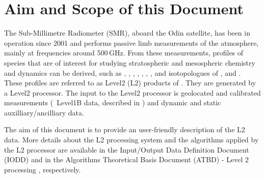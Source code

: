 \chapter{Aim and Scope of this Document}
\label{chapter:intro}

\setcounter{page}{1}

The Sub-Millimetre Radiometer (SMR), aboard the Odin satellite, has been in operation
since 2001 and performs passive limb measurements of the atmosphere, mainly at 
frequencies around 500\,GHz. From these measurements, profiles of species that are of
interest for studying stratospheric and mesospheric chemistry and dynamics can be
derived, such as , , , , ,
, , and isotopologues of , and .
These profiles are referred to as Level2 (L2) products of \smr. They are generated by
a Level2 processor. The input to the Level2 processor is geolocated and calibrated
measurements (\smr\ Level1B data, described in \citet{atbdl1b}) and dynamic and
static auxilliary/ancilliary data.

The aim of this document is to provide an user-friendly description of the L2 data.
More details about the L2 processing system and the algorithms applied by the L2
processor are available in the Input/Output Data Definition Document (IODD) \citep{iodd}
and in the Algorithms Theoretical Basis Document (ATBD) - Level 2 processing \citep{atbdl2},
respectively. 
  
